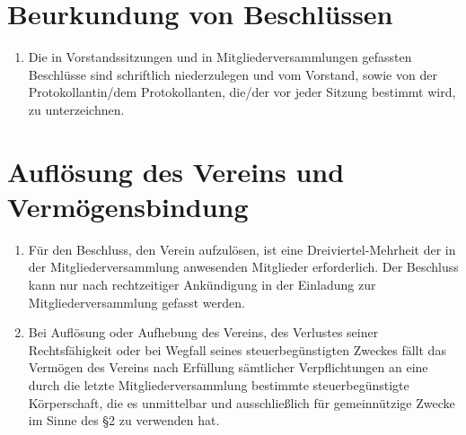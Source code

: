 \documentclass[a4paper,12pt]{scrartcl}
\begin{document}
\section{Beurkundung von Beschlüssen}
\begin{enumerate}
  \item Die in Vorstandssitzungen und in Mitgliederversammlungen gefassten
    Beschlüsse sind schriftlich niederzulegen und vom Vorstand, sowie von
    der Protokollantin/dem Protokollanten, die/der vor jeder Sitzung bestimmt 
    wird, zu unterzeichnen.
\end{enumerate}

\section{Auflösung des Vereins und Vermögensbindung}
\begin{enumerate}
  \item Für den Beschluss, den Verein aufzulösen, ist eine Dreiviertel-Mehrheit
    der in der Mitgliederversammlung anwesenden Mitglieder erforderlich. Der
    Beschluss kann nur nach rechtzeitiger Ankündigung in der Einladung zur
    Mitgliederversammlung gefasst werden.
  \item Bei Auflösung oder Aufhebung des Vereins, des Verlustes seiner
    Rechtsfähigkeit oder bei Wegfall seines steuerbegünstigten Zweckes fällt
    das Vermögen des Vereins nach Erfüllung sämtlicher Verpflichtungen an
    eine durch die letzte Mitgliederversammlung bestimmte steuerbegünstigte
    Körperschaft, die es unmittelbar und ausschließlich für gemeinnützige
    Zwecke im Sinne des §2 zu verwenden hat.
\end{enumerate}
\end{document}
